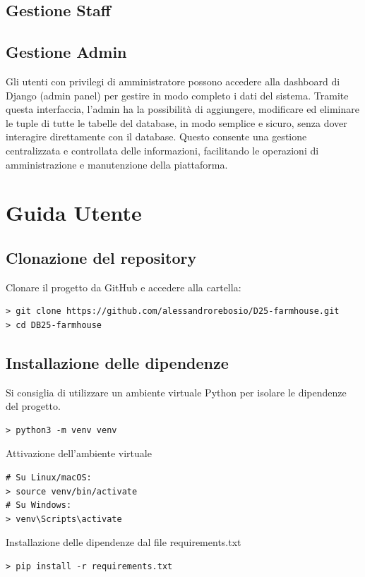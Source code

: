 \documentclass[a4paper,12pt]{report}
\begin{document}
\section{Gestione Staff}

\section{Gestione Admin}
Gli utenti con privilegi di amministratore possono accedere alla dashboard di Django (admin panel)
per gestire in modo completo i dati del sistema. Tramite questa interfaccia, l'admin ha la
possibilità di aggiungere, modificare ed eliminare le tuple di tutte le tabelle del database, in modo
semplice e sicuro, senza dover interagire direttamente con il database. Questo consente una gestione
centralizzata e controllata delle informazioni, facilitando le operazioni di amministrazione e manutenzione
della piattaforma.

\appendix
\chapter{Guida Utente}

\section{Clonazione del repository}
Clonare il progetto da GitHub e accedere alla cartella:

\begin{verbatim}
> git clone https://github.com/alessandrorebosio/D25-farmhouse.git
> cd DB25-farmhouse
\end{verbatim}

\section{Installazione delle dipendenze}

Si consiglia di utilizzare un ambiente virtuale Python per isolare le dipendenze del progetto.

\begin{verbatim}
> python3 -m venv venv
\end{verbatim}

\noindent Attivazione dell'ambiente virtuale
\begin{verbatim}
# Su Linux/macOS:
> source venv/bin/activate
# Su Windows:
> venv\Scripts\activate
\end{verbatim}

\noindent Installazione delle dipendenze dal file requirements.txt
\begin{verbatim}
> pip install -r requirements.txt
\end{verbatim}
\end{document}
